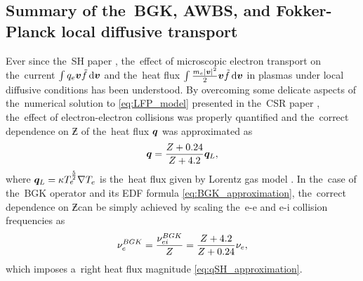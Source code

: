 
\subsection{Summary of the~BGK, AWBS, and Fokker-Planck local diffusive 
transport}
\label{sec:SummaryDiffusiveKinetics}

Ever since the~SH paper \cite{SpitzerHarm_PR1953}, the~effect of microscopic
electron transport on the~current $\int q_e \boldsymbol{v} \tilde{f} \, \text{d}\boldsymbol{v}$ 
and the~heat flux $\int \frac{m_e |\boldsymbol{v}|^2}{2} \boldsymbol{v} \tilde{f} \, \text{d}\boldsymbol{v}$ 
in plasmas
under local diffusive conditions has been understood. By overcoming some 
delicate aspects of the~numerical solution to \eqref{eq:LFP_model} presented 
in the~CSR paper \cite{CSR_1950}, the~effect of electron-electron collisions
was properly quantified and the~correct dependence on $\Zbar$ of the~heat flux
$\boldsymbol{q}$ was approximated as \cite{SpitzerHarm_PR1953, Epperlein_PoFB1991} 
\begin{equation}
  \boldsymbol{q} = \frac{Z + 0.24}{Z + 4.2} \boldsymbol{q}_L ,
  \label{eq:qSH_approximation}
\end{equation}
where $\boldsymbol{q}_L = \kappa T_e^{\frac{5}{2}}\nabla T_e$ is the~heat flux given 
by Lorentz gas model \cite{Lorentz_1905}. In the~case of the~BGK operator 
and its EDF formula \eqref{eq:BGK_approximation}, the~correct dependence on 
$\Zbar$can be simply achieved by scaling the~e-e and e-i collision 
frequencies as
\begin{equation}
  \nu_{e}^{BGK} = \frac{\nu_{ei}^{BGK}}{Z}
  = \frac{Z + 4.2}{Z + 0.24}\nu_{e} ,
  \label{eq:BGK_scaling}
\end{equation}
which imposes a~right heat flux magnitude \eqref{eq:qSH_approximation}. 

